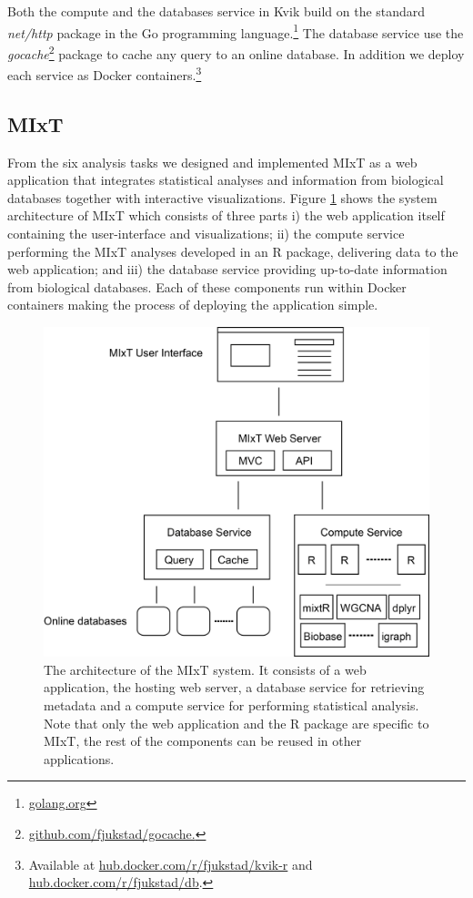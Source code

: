 Both the compute and the databases service in Kvik build on the standard
\emph{net/http} package in the Go programming
language.\footnote{\url{golang.org}} The database service use
the \emph{gocache}\footnote{\url{github.com/fjukstad/gocache.}} package to cache
any query to an online database. In addition we deploy each service as Docker
containers.\footnote{Available at \url{hub.docker.com/r/fjukstad/kvik-r} and
\url{hub.docker.com/r/fjukstad/db}.}

\subsection{MIxT}
From the six analysis tasks we designed and implemented MIxT as a web
application that integrates statistical analyses and information from biological
databases together with interactive visualizations. Figure \ref{kvik-mixt} shows
the system architecture of MIxT which consists of three parts i) the
web application itself containing the user-interface and visualizations; ii) the
compute service performing the MIxT analyses developed in an R package,
delivering data to the web application; and iii) the database service providing
up-to-date information from biological databases.  Each of these components run
within Docker containers making the process of deploying the application simple. 

\begin{figure}[h!]
\centering
\includegraphics[scale=0.4]{figures/mixt-architecture.png}
\caption{The architecture of the MIxT system. It consists of
a web application, the hosting web server, a database service for retrieving
metadata and a compute service for performing statistical analysis. Note that
only the web application and the R package are specific to MIxT, the rest of the
components can be reused in other applications.} 
\label{kvik-mixt}
\end{figure} 

